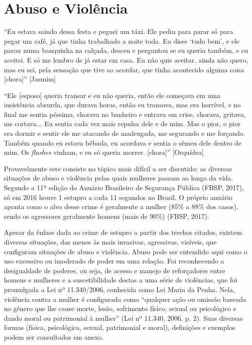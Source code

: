 \section*{Abuso e Violência}

``Eu estava saindo dessa festa e peguei um táxi. Ele pediu para parar só para pegar um café, já que tinha trabalhado a noite toda. Eu disse ‘tudo bem’, e ele parou numa banquinha na calçada, desceu e perguntou se eu queria também, e eu aceitei. E só me lembro de já estar em casa. Eu não quis aceitar, ainda não quero, mas eu sei, pela sensação que tive ao acordar, que tinha acontecido alguma coisa [chora]'' [Jasmim] 

``Ele [esposo] queria transar e eu não queria, então ele começava em uma insistência absurda, que durava horas, então eu transava, mas era horrível, e no final me sentia péssima, chorava no banheiro e entrava em crise, chorava, gritava, me cortava... Eu sentia cada vez mais repulsa dele e de mim. Mas o pior, o pior era dormir e sentir ele me atacando de madrugada, me segurando e me forçando. Também quando eu estava bêbada, eu acordava e sentia o sêmen dele dentro de mim. Os \textit{flashes} vinham, e eu só queria morrer. [chora]'' [Orquídea]

Provavelmente este consiste no tópico mais difícil a ser discutido: as diversas situações de abuso e violência pelas quais mulheres passam ao longo da vida. Segundo a 11ª edição do Anuário Brasileiro de Segurança Pública (FBSP, 2017), só em 2016 houve 1 estupro a cada 11 segundos no Brasil. O próprio anuário aponta como o alvo desse crime é geralmente a mulher (85\% a 88\% dos casos), sendo os agressores geralmente homens (mais de 90\%) (FBSP, 2017).

Apesar da ênfase dada ao crime de estupro a partir dos trechos citados, existem diversas situações, das menos às mais invasivas, agressivas, visíveis, que configuram situações de abuso e violência. Abuso pode ser entendido aqui como o uso excessivo ou imoderado de poder em uma relação. Foi reconhecendo a desigualdade de poderes, ou seja, de acesso e manejo de reforçadores entre homens e mulheres e a suscetibilidade destas a uma série de violências, que foi promulgada a Lei nº 11.340/2006, conhecida como Lei Maria da Penha. Nela, violência contra a mulher é configurada como ``qualquer ação ou omissão baseada no gênero que lhe cause morte, lesão, sofrimento físico, sexual ou psicológico e dando moral ou patrimonial à mulher'' (Lei nº 11.340, 2006, p. 2). Suas diversas formas (física, psicológica, sexual, patrimonial e moral), definições e exemplos podem ser consultados em anexo.

